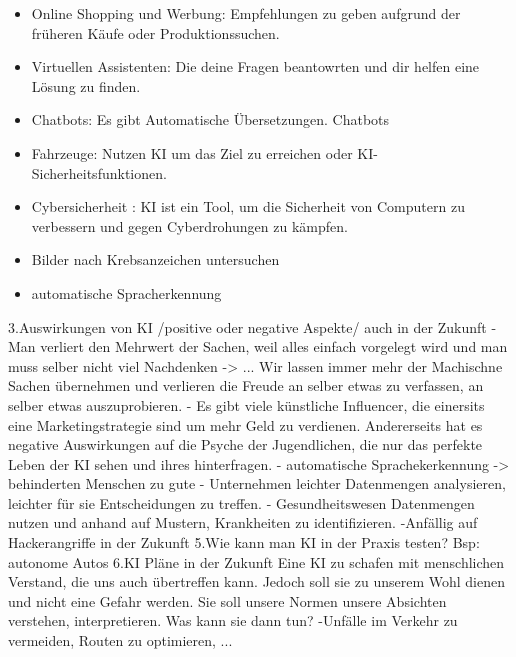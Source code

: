 \begin{enumerate}
\begin{itemize}
    \item Online Shopping und Werbung: Empfehlungen zu geben aufgrund der früheren Käufe oder Produktionssuchen.
    \item Virtuellen Assistenten: Die deine Fragen beantowrten und dir helfen eine Lösung zu finden.
    \item Chatbots: Es gibt Automatische Übersetzungen. Chatbots
    \item Fahrzeuge: Nutzen KI um das Ziel zu erreichen oder KI- Sicherheitsfunktionen.
    \item Cybersicherheit : KI ist ein Tool, um die Sicherheit von Computern zu verbessern und gegen Cyberdrohungen zu kämpfen.
    \item Bilder nach Krebsanzeichen untersuchen 
    \item automatische Spracherkennung
\end{itemize}
3.Auswirkungen von KI /positive oder negative Aspekte/ auch in der Zukunft
- Man verliert den Mehrwert der Sachen, weil alles einfach vorgelegt wird und man muss selber nicht viel Nachdenken -> ... Wir lassen immer mehr  der Machischne Sachen übernehmen und verlieren die Freude an selber etwas zu verfassen, an selber etwas auszuprobieren.
- Es gibt viele künstliche Influencer, die einersits eine Marketingstrategie sind um mehr Geld zu verdienen. Andererseits hat es negative Auswirkungen auf die Psyche der Jugendlichen, die nur das perfekte Leben der KI sehen und ihres hinterfragen.
- automatische Sprachekerkennung -> behinderten Menschen zu gute 
- Unternehmen leichter Datenmengen analysieren, leichter für sie Entscheidungen zu treffen.
- Gesundheitswesen Datenmengen nutzen und anhand auf Mustern, Krankheiten zu identifizieren. 
-Anfällig auf Hackerangriffe in der Zukunft
5.Wie kann man KI in der Praxis testen?
Bsp: autonome Autos
6.KI Pläne in der Zukunft
Eine KI zu schafen mit menschlichen Verstand, die uns auch übertreffen kann. Jedoch soll sie zu unserem Wohl dienen und nicht eine Gefahr werden.
Sie soll unsere Normen unsere Absichten verstehen, interpretieren.
Was kann sie dann tun?
-Unfälle im Verkehr zu vermeiden, Routen zu optimieren,  
...

\end{enumerate}